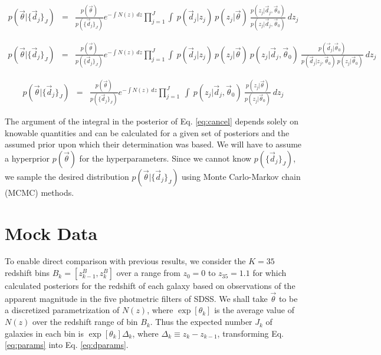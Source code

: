 \documentclass[12pt, onecolumn]{emulateapj}
\begin{document}
\begin{eqnarray}
\label{eq:trick}
p(\vec{\theta}|\{\vec{d}_{j}\}_{J}) &=& \frac{p(\vec{\theta})}{p(\{\vec{d}_{j}\}_{J})}e^{-\int N(z)\ dz}\prod_{j=1}^{J}\int\ p(\vec{d}_{j}|z_{j})\ p(z_{j}|\vec{\theta})\ \frac{p(z_{j}|\vec{d}_{j},\vec{\theta}_{0})}{p(z_{j}|\vec{d}_{j},\vec{\theta}_{0})}\ dz_{j}
\end{eqnarray}

\begin{eqnarray}
\label{eq:expand}
p(\vec{\theta}|\{\vec{d}_{j}\}_{J}) &=& \frac{p(\vec{\theta})}{p(\{\vec{d}_{j}\}_{J})}e^{-\int N(z)\ dz}\prod_{j=1}^{J}\int\ p(\vec{d}_{j}|z_{j})\ p(z_{j}|\vec{\theta})\ p(z_{j}|\vec{d}_{j},\vec{\theta}_{0})\ \frac{p(\vec{d}_{j}|\vec{\theta}_{0})}{p(\vec{d}_{j}|z_{j},\vec{\theta}_{0})\ p(z_{j}|\vec{\theta}_{0})}\ dz_{j}
\end{eqnarray}

\begin{eqnarray}
\label{eq:cancel}
p(\vec{\theta}|\{\vec{d}_{j}\}_{J}) &=& \frac{p(\vec{\theta})}{p(\{\vec{d}_{j}\}_{J})}e^{-\int N(z)\ dz}\prod_{j=1}^{J}\ \int\ p(z_{j}|\vec{d}_{j},\vec{\theta}_{0})\ \frac{p(z_{j}|\vec{\theta})}{p(z_{j}|\vec{\theta}_{0})}\ dz_{j}
\end{eqnarray}

The argument of the integral in the posterior of Eq. \ref{eq:cancel} depends solely on knowable quantities and can be calculated for a given set of posteriors and the assumed prior upon which their determination was based.  We will have to assume a hyperprior $p(\vec{\theta})$ for the hyperparameters.  Since we cannot know $p(\{\vec{d}_{j}\}_{J})$, we sample the desired distribution $p(\vec{\theta}|\{\vec{d}_{j}\}_{J})$ using Monte Carlo-Markov chain (MCMC) methods.  

\section{Mock Data}
\label{sec:mock}

To enable direct comparison with previous results, we consider the $K=35$ redshift bins $B_{k}=[z^{B}_{k-1},z^{B}_{k}]$ over a range from $z_{0}=0$ to $z_{35}=1.1$ for which \citet{she11} calculated posteriors for the redshift of each galaxy based on observations of the apparent magnitude in the five photmetric filters of SDSS.  We shall take $\vec{\theta}$ to be a discretized parametrization of $N(z)$, where $\exp[\theta_{k}]$ is the average value of $N(z)$ over the redshift range of bin $B_{k}$.   Thus the expected number $J_{k}$ of galaxies in each bin is $\exp[\theta_{k}]\Delta_{k}$, where $\Delta_{k}\equiv z_{k}-z_{k-1}$, transforming Eq. \ref{eq:params} into Eq. \ref{eq:dparams}.
\end{document}
